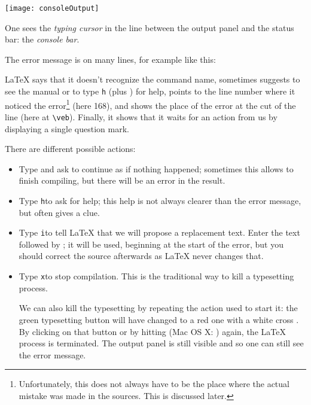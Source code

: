 \begin{center}\label{fig:consoleOutput}
\texttt{[image: consoleOutput]}
\end{center}

One sees the \emph{typing cursor} in the line between the output panel and the status bar: the \emph{console bar}.

The error message is on many lines, for example like this:
\smallskip


{\LaTeX} says that it doesn't recognize the command name, sometimes suggests to see the manual or to type \verb|h| (plus \Return) for help, points to the line number where it noticed the error\footnote{Unfortunately, this does not always have to be the place where the actual mistake was made in the sources. This is discussed later.} (here 168), and shows the place of the error at the cut of the line (here at \verb|\veb|). Finally, it shows that it waits for an action from us by displaying a single question mark.

There are different possible actions:
\begin{itemize}
\item Type \Return and ask to continue as if nothing happened; sometimes this allows to finish compiling, but there will be an error in the result.
\item Type \verb+h+\Return to ask for help; this help is not always clearer than the error message, but often gives a clue.
\item Type \verb+i+\Return to tell {\LaTeX} that we will propose a replacement text. Enter the text followed by \Return; it will be used, beginning at the start of the error, but you should correct the source afterwards as {\LaTeX} never changes that.
\item Type \verb+x+\Return to stop compilation. This is the traditional {\AllTeX} way to kill a typesetting process.

We can also kill the typesetting by repeating the action used to start it: the green typesetting button will have changed to a red one with a white cross .
By clicking on that button or by hitting  (Mac OS X: ) again, the {\LaTeX} process is terminated. The output panel is still visible and so one can still see the error message.
\end{itemize}

